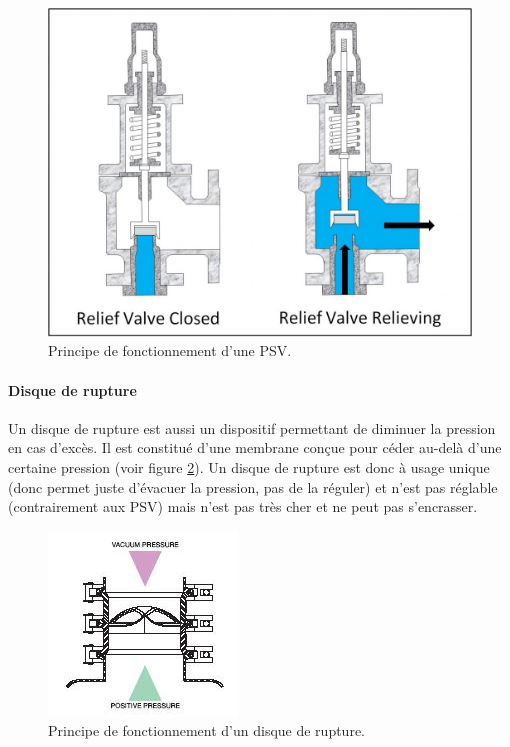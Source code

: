 \begin{figure}[ht]
	\centering
	\includegraphics[scale=0.2]{media/safety-valve.jpg}
	\caption{Principe de fonctionnement d'une PSV.}
	\label{fig:safety-valve}
\end{figure}

\paragraph{Disque de rupture}
Un disque de rupture est aussi un dispositif
permettant de diminuer la pression en cas d'excès.
Il est constitué d'une membrane conçue pour céder
au-delà d'une certaine pression 
(voir figure \ref{fig:rupture-disc}). Un disque
de rupture est donc à usage unique (donc permet juste
d'évacuer la pression, pas de la réguler) et n'est pas
réglable (contrairement aux PSV) mais n'est pas
très cher et ne peut pas s'encrasser.

\begin{figure}[ht]
	\centering
	\includegraphics[scale=0.8]{media/rupture-disc.jpg}
	\caption{Principe de fonctionnement d'un disque de rupture.}
	\label{fig:rupture-disc}
\end{figure}

